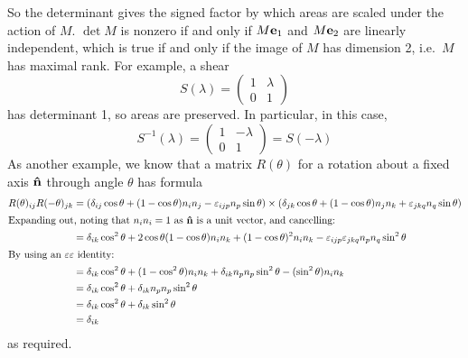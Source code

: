 So the determinant gives the signed factor by which areas are scaled under the action of \(M\).
\(\det M\) is nonzero if and only if \(M\vb e_1\) and \(M\vb e_2\) are linearly independent, which is true if and only if the image of \(M\) has dimension 2, i.e.\ \(M\) has maximal rank.
For example, a shear
\[
	S(\lambda) = \begin{pmatrix}
		1 & \lambda \\ 0 & 1
	\end{pmatrix}
\]
has determinant 1, so areas are preserved.
In particular, in this case,
\[
	S^{-1}(\lambda) = \begin{pmatrix}
		1 & -\lambda \\ 0 & 1
	\end{pmatrix} = S(-\lambda)
\]
As another example, we know that a matrix \(R(\theta)\) for a rotation about a fixed axis \(\vu{n}\) through angle \(\theta\) has formula
\begin{align*}
	R(\theta)_{ij} R(-\theta)_{jk} & = (\delta_{ij}\cos \theta + (1 - \cos \theta) n_i n_j - \varepsilon_{ijp}n_p \sin \theta) \times (\delta_{jk}\cos \theta + (1 - \cos \theta) n_j n_k + \varepsilon_{jkq}n_q \sin \theta) \\
	\intertext{Expanding out, noting that \(n_i n_i = 1\) as \(\vu{n}\) is a unit vector, and cancelling:}
	                               & = \delta_{ik} \cos^2 \theta + 2\cos \theta(1 - \cos \theta) n_i n_k + (1 - \cos \theta)^2n_i n_k - \varepsilon_{ijp}\varepsilon_{jkq} n_p n_q \sin^2 \theta                              \\
	\intertext{By using an \(\varepsilon\varepsilon\) identity:}
	                               & = \delta_{ik}\cos^2\theta + (1 - \cos^2 \theta)n_i n_k + \delta_{ik}n_p n_p \sin^2 \theta - (\sin^2 \theta)n_i n_k                                                                       \\
	                               & = \delta_{ik}\cos^2\theta + \delta_{ik}n_p n_p \sin^2 \theta                                                                                                                             \\
	                               & = \delta_{ik}\cos^2\theta + \delta_{ik} \sin^2 \theta                                                                                                                                    \\
	                               & = \delta_{ik}
\end{align*}
as required.
